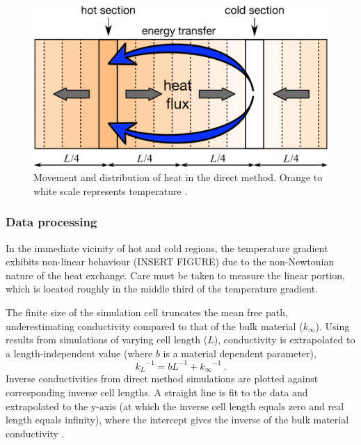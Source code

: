 \begin{figure}[h]
  \includegraphics[width=\linewidth]{Figures/ss_direct_mod.png}
  \caption{Movement and distribution of heat in the direct method. Orange to white scale represents temperature \citep[modified from][]{Stackhouse2015}.}
  \label{fig:ss_direct}
\end{figure}



\subsubsection{Data processing}

In the immediate vicinity of hot and cold regions, the temperature gradient exhibits non-linear behaviour (INSERT FIGURE) due to the non-Newtonian nature of the heat exchange. Care must be taken to measure the linear portion, which is located roughly in the middle third of the temperature gradient. 

The finite size of the simulation cell truncates the mean free path, underestimating conductivity compared to that of the bulk material ($k_\infty$). Using results from simulations of varying cell length ($L$), conductivity is extrapolated to a length-independent value (where $b$ is a material dependent parameter),
%
\begin{equation}
{k_{L}}^{-1} = b L^{-1} + {k_{\infty}}^{-1}\ . 
\label{linear-extrap}
\end{equation}
%
Inverse conductivities from direct method simulations are plotted against corresponding inverse cell lengths. A straight line is fit to the data and extrapolated to the y-axis (at which the inverse cell length equals zero and real length equals infinity), where the intercept gives the inverse of the bulk material conductivity \citep{Schelling2002}.

